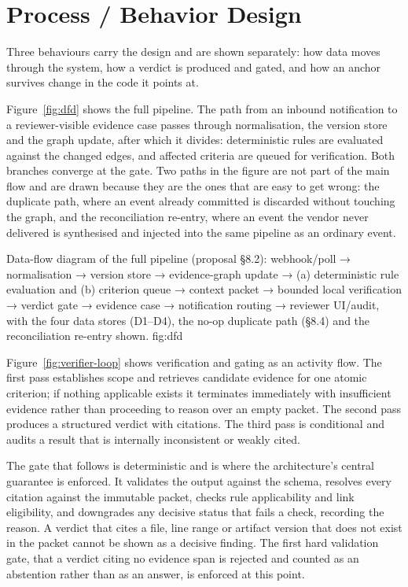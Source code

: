 \section{Process / Behavior Design}

Three behaviours carry the design and are shown separately: how data moves
through the system, how a verdict is produced and gated, and how an anchor
survives change in the code it points at.

Figure~\ref{fig:dfd} shows the full pipeline. The path from an inbound
notification to a reviewer-visible evidence case passes through normalisation,
the version store and the graph update, after which it divides: deterministic
rules are evaluated against the changed edges, and affected criteria are queued
for verification. Both branches converge at the gate. Two paths in the figure
are not part of the main flow and are drawn because they are the ones that are
easy to get wrong: the duplicate path, where an event already committed is
discarded without touching the graph, and the reconciliation re-entry, where an
event the vendor never delivered is synthesised and injected into the same
pipeline as an ordinary event.

\lsfigure{}
  {Data-flow diagram of the full pipeline (proposal §8.2):
           webhook/poll → normalisation → version store → evidence-graph
           update → (a) deterministic rule evaluation and (b) criterion
           queue → context packet → bounded local verification → verdict
           gate → evidence case → notification routing → reviewer UI/audit,
           with the four data stores (D1–D4), the no-op duplicate path
           (§8.4) and the reconciliation re-entry shown.}
  {fig:dfd}

Figure~\ref{fig:verifier-loop} shows verification and gating as an activity
flow. The first pass establishes scope and retrieves candidate evidence for one
atomic criterion; if nothing applicable exists it terminates immediately with
insufficient evidence rather than proceeding to reason over an empty packet. The
second pass produces a structured verdict with citations. The third pass is
conditional and audits a result that is internally inconsistent or weakly cited.

The gate that follows is deterministic and is where the architecture's central
guarantee is enforced. It validates the output against the schema, resolves every
citation against the immutable packet, checks rule applicability and link
eligibility, and downgrades any decisive status that fails a check, recording the
reason. A verdict that cites a file, line range or artifact version that does not
exist in the packet cannot be shown as a decisive finding. The first hard
validation gate, that a verdict citing no evidence span is rejected and counted
as an abstention rather than as an answer, is enforced at this point.

